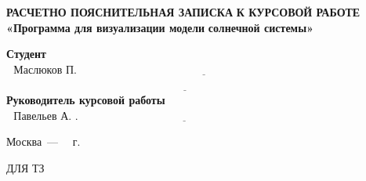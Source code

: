 \begin{titlepage}
	\begin{center}
  		\noindent\begin{minipage}{1.3\textwidth}\centering
  		\Large\textbf{РАСЧЕТНО ПОЯСНИТЕЛЬНАЯ ЗАПИСКА}\newline
  		\textbf{К КУРСОВОЙ РАБОТЕ}\newline
  		\textbf{«Программа для визуализации модели}\newline
  		\textbf{   солнечной системы»}\newline\newline\newline
  		\end{minipage}
	\end{center}
	
	\noindent\textbf{Студент} $\underline{\text{~~Маслюков П. В.~~~~~~~~~~~~~~~~~~~~~~~~~~~~~~~~~~~~~~~~~~~~~~~~~~~~~~~~~~~~~~~~~~~~~~~~~~~~~~~~~~~~~~~~~}}$\newline\newline
 $\underline{\text{~~~~~~~~~~~~~~~~~~~~~~~~~~~~~~~~~~~~~~~~~~~~~~~~~~~~~~~~~~~~~~~~~~~~~~~~~~~~~~~~~~~~~~~~~~~~~~~~~~}}$\newline\newline
	\noindent\textbf{Руководитель курсовой работы} $\underline{\text{~~Павельев А. .~~~~~~~~~~~~~~~~~~~~~~~~~~~~~~~~~~~~~~~~~~~~~~~~~~~~~~~~~~~~~~~~~~~~~~~~~~~~~~}}$\newline
	
	\begin{center}
		\vfill
		Москва~---~\the\year
		~г.
	\end{center}
	\restoregeometry
	\newpage
	ДЛЯ ТЗ
\end{titlepage}

